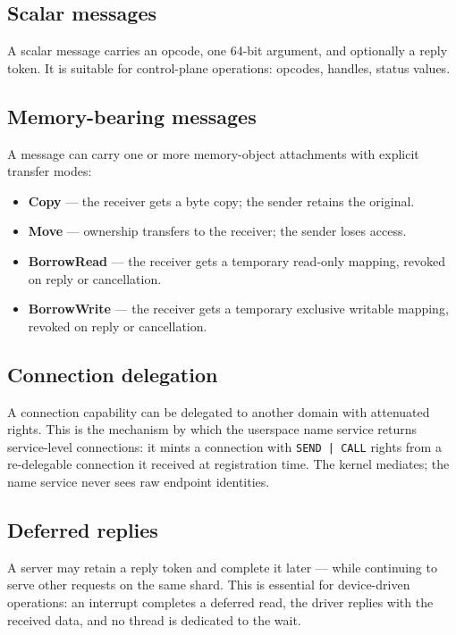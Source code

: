 \subsection{Scalar messages}

A scalar message carries an opcode, one 64-bit argument, and optionally a reply
token. It is suitable for control-plane operations: opcodes, handles, status
values.

\subsection{Memory-bearing messages}

A message can carry one or more memory-object attachments with explicit transfer
modes:

\begin{itemize}
    \item \textbf{Copy} --- the receiver gets a byte copy; the sender retains
        the original.
    \item \textbf{Move} --- ownership transfers to the receiver; the sender
        loses access.
    \item \textbf{BorrowRead} --- the receiver gets a temporary read-only
        mapping, revoked on reply or cancellation.
    \item \textbf{BorrowWrite} --- the receiver gets a temporary exclusive
        writable mapping, revoked on reply or cancellation.
\end{itemize}

\subsection{Connection delegation}

A connection capability can be delegated to another domain with attenuated
rights. This is the mechanism by which the userspace name service returns
service-level connections: it mints a connection with \texttt{SEND | CALL}
rights from a re-delegable connection it received at registration time. The
kernel mediates; the name service never sees raw endpoint identities.

\subsection{Deferred replies}

A server may retain a reply token and complete it later --- while continuing to
serve other requests on the same shard. This is essential for device-driven
operations: an interrupt completes a deferred read, the driver replies with the
received data, and no thread is dedicated to the wait.

